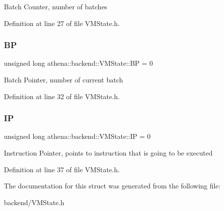 Batch Counter, number of batches 

Definition at line 27 of file V\+M\+State.\+h.

\mbox{\label{structathena_1_1backend_1_1_v_m_state_a1fb11ee3d01bf657152300143ba4cc46}} 
\subsubsection{\texorpdfstring{BP}{BP}}
{\footnotesize\ttfamily unsigned long athena\+::backend\+::\+V\+M\+State\+::\+BP = 0}

Batch Pointer, number of current batch 

Definition at line 32 of file V\+M\+State.\+h.

\mbox{\label{structathena_1_1backend_1_1_v_m_state_a1da90c7b0a431dd55ca1845338a04d81}} 
\subsubsection{\texorpdfstring{IP}{IP}}
{\footnotesize\ttfamily unsigned long athena\+::backend\+::\+V\+M\+State\+::\+IP = 0}

Instruction Pointer, points to instruction that is going to be executed 

Definition at line 37 of file V\+M\+State.\+h.



The documentation for this struct was generated from the following file\+:\begin{DoxyCompactItemize}
\item 
backend/V\+M\+State.\+h\end{DoxyCompactItemize}
